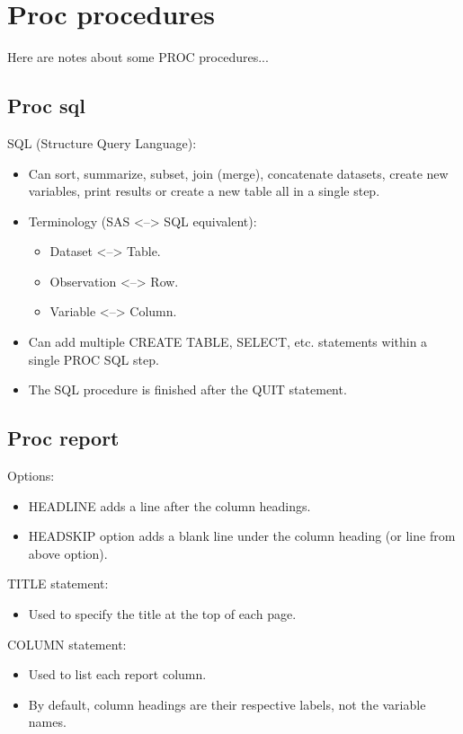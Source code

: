\documentclass[11pt, oneside]{article}
\begin{document}
\section{Proc procedures}

Here are notes about some PROC procedures...

\subsection{Proc sql}

SQL (Structure Query Language):
\begin{itemize}
\item Can sort, summarize, subset, join (merge), concatenate datasets, create new variables, print results or create a new table all in a single step.
\item Terminology (SAS <--> SQL equivalent):
	\begin{itemize}
	\item Dataset <--> Table.
	\item Observation <--> Row.
	\item Variable <--> Column.
	\end{itemize}
\item Can add multiple CREATE TABLE, SELECT, etc. statements within a single PROC SQL step.
\item The SQL procedure is finished after the QUIT statement.
\end{itemize}



\subsection{Proc report}	

Options:
\begin{itemize}
\item HEADLINE adds a line after the column headings.
\item HEADSKIP option adds a blank line under the column heading (or line from above option).
\end{itemize}
TITLE statement:
\begin{itemize}
\item Used to specify the title at the top of each page.
\end{itemize}

COLUMN statement:
\begin{itemize}
\item Used to list each report column.
\item By default, column headings are their respective labels, not the variable names. 
\end{itemize}
\end{document}
